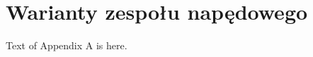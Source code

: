 \chapter{Warianty zespołu napędowego}
\label{appA_warianty_zespolu_napedowego}

Text of Appendix A is here.